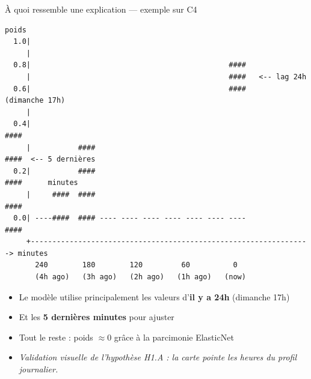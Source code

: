 \documentclass[10pt]{beamer}
\begin{document}
\begin{frame}[fragile]{À quoi ressemble une explication — exemple sur C4}
  \begin{tcolorbox}[colback=blue!3, colframe=blue!50!black, arc=2mm, fonttitle=\bfseries,
                    title={Carte d'évidence pour t = ``lundi 17h00'' (function 953)}]
    \tiny
\begin{verbatim}
poids
  1.0|
     |
  0.8|                                              ####
     |                                              ####   <-- lag 24h
  0.6|                                              ####       (dimanche 17h)
     |
  0.4|                                                              ####
     |           ####                                              ####  <-- 5 dernières
  0.2|           ####                                              ####      minutes
     |     ####  ####                                              ####
  0.0| ----####  #### ---- ---- ---- ---- ---- ---- ----           ####
     +-----------------------------------------------------------------> minutes
       240        180        120         60          0
       (4h ago)   (3h ago)   (2h ago)   (1h ago)   (now)
\end{verbatim}
  \end{tcolorbox}

  \begin{tcolorbox}[colback=newcontrib!5, colframe=newcontrib!70!black, arc=2mm, fonttitle=\bfseries,
                    title=Lecture]
    \begin{itemize}
      \item Le modèle utilise principalement les valeurs d'\textbf{il y a 24h} (dimanche 17h)
      \item Et les \textbf{5 dernières minutes} pour ajuster
      \item Tout le reste : poids $\approx 0$ grâce à la parcimonie ElasticNet
      \item \emph{Validation visuelle de l'hypothèse H1.A : la carte pointe les heures du profil journalier.}
    \end{itemize}
  \end{tcolorbox}
\end{frame}
\end{document}
